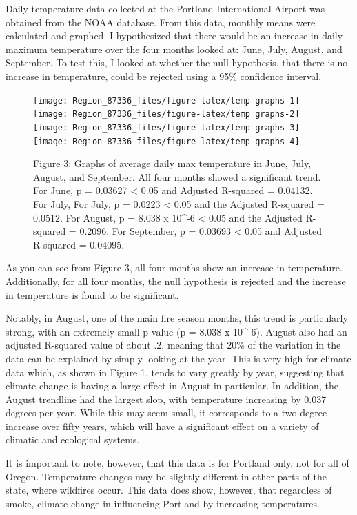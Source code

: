 \documentclass[]{article}
\begin{document}
Daily temperature data collected at the Portland International Airport
was obtained from the NOAA database. From this data, monthly means were
calculated and graphed. I hypothesized that there would be an increase
in daily maximum temperature over the four months looked at: June, July,
August, and September. To test this, I looked at whether the null
hypothesis, that there is no increase in temperature, could be rejected
using a 95\% confidence interval.

\begin{figure}
\texttt{[image: Region\_87336\_files/figure-latex/temp graphs-1]} \texttt{[image: Region\_87336\_files/figure-latex/temp graphs-2]} \texttt{[image: Region\_87336\_files/figure-latex/temp graphs-3]} \texttt{[image: Region\_87336\_files/figure-latex/temp graphs-4]} \caption{Figure 3: Graphs of average daily max temperature in June, July, August, and September. All four months showed a significant trend. For June, p = 0.03627 < 0.05 and Adjusted R-squared = 0.04132. For July, For July, p = 0.0223 < 0.05 and the Adjusted R-squared = 0.0512. For August, p = 8.038 x 10^-6 < 0.05 and the Adjusted R-squared = 0.2096. For September, p = 0.03693 < 0.05 and Adjusted R-squared = 0.04095.}\label{fig:temp graphs}
\end{figure}

As you can see from Figure 3, all four months show an increase in
temperature. Additionally, for all four months, the null hypothesis is
rejected and the increase in temperature is found to be significant.

Notably, in August, one of the main fire season months, this trend is
particularly strong, with an extremely small p-value (p = 8.038 x
10\^{}-6). August also had an adjusted R-squared value of about .2,
meaning that 20\% of the variation in the data can be explained by
simply looking at the year. This is very high for climate data which, as
shown in Figure 1, tends to vary greatly by year, suggesting that
climate change is having a large effect in August in particular. In
addition, the August trendline had the largest slop, with temperature
increasing by 0.037 degrees per year. While this may seem small, it
corresponds to a two degree increase over fifty years, which will have a
significant effect on a variety of climatic and ecological systems.

It is important to note, however, that this data is for Portland only,
not for all of Oregon. Temperature changes may be slightly different in
other parts of the state, where wildfires occur. This data does show,
however, that regardless of smoke, climate change in influencing
Portland by increasing temperatures.
\end{document}
